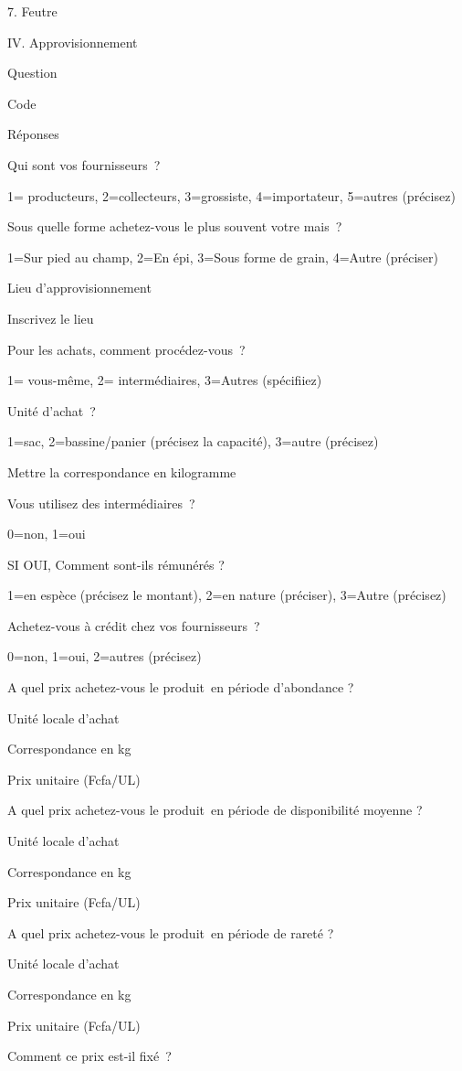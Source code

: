 \documentclass[12pt,oneside]{report}
\begin{document}
7. Feutre

IV. Approvisionnement

Question

Code

Réponses

Qui sont vos fournisseurs ?

1= producteurs, 2=collecteurs, 3=grossiste, 4=importateur, 5=autres (précisez)

Sous quelle forme achetez-vous le plus souvent votre mais ?

1=Sur pied au champ, 2=En épi, 3=Sous forme de grain, 4=Autre (préciser)

Lieu d’approvisionnement

Inscrivez le lieu

Pour les achats, comment procédez-vous ?

1= vous-même, 2= intermédiaires, 3=Autres (spécifiiez)

Unité d’achat ?

1=sac, 2=bassine/panier (précisez la capacité), 3=autre (précisez)

Mettre la correspondance en kilogramme

Vous utilisez des intermédiaires ?

0=non, 1=oui

SI OUI, Comment sont-ils rémunérés ?

1=en espèce (précisez le montant), 2=en nature (préciser), 3=Autre (précisez)

Achetez-vous à crédit chez vos fournisseurs ?

0=non, 1=oui, 2=autres (précisez)

A quel prix achetez-vous le produit en période d’abondance ?

Unité locale d’achat

Correspondance en kg

Prix unitaire (Fcfa/UL)

A quel prix achetez-vous le produit en période de disponibilité moyenne ?

Unité locale d’achat

Correspondance en kg

Prix unitaire (Fcfa/UL)

A quel prix achetez-vous le produit en période de rareté ?

Unité locale d’achat

Correspondance en kg

Prix unitaire (Fcfa/UL)

Comment ce prix est-il fixé ?
\end{document}

